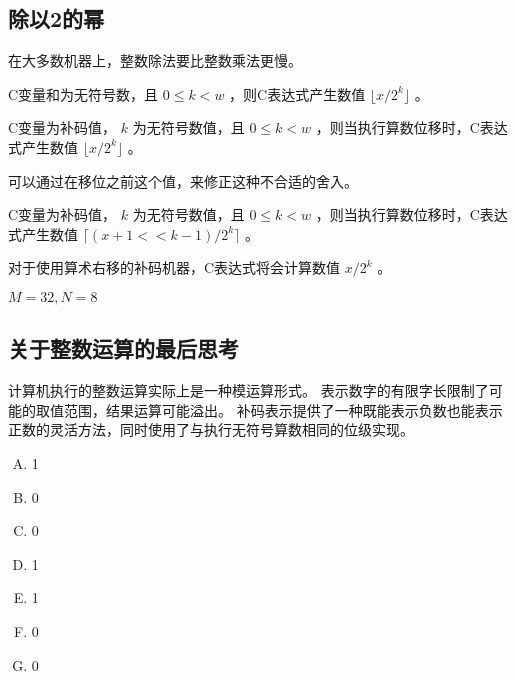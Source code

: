 {    \subsection{除以2的幂}
    {
        在大多数机器上，整数除法要比整数乘法更慢。

        \begin{defines}[除以2的幂的无符号除法]
            C变量和为无符号数，且 $0 \leq k < w$ ，则C表达式产生数值 $\lfloor x / 2^k \rfloor$ 。
        \end{defines}

        \begin{defines}
            C变量为补码值， $k$ 为无符号数值，且 $0 \leq k < w$ ，则当执行算数位移时，C表达式产生数值 $\lfloor x / 2^k \rfloor$ 。
        \end{defines}

        可以通过在移位之前这个值，来修正这种不合适的舍入。

        \begin{defines}
            C变量为补码值， $k$ 为无符号数值，且 $0 \leq k < w$ ，则当执行算数位移时，C表达式产生数值 $\lceil (x + 1 << k - 1) / 2^k \rceil$ 。
        \end{defines}

        对于使用算术右移的补码机器，C表达式将会计算数值 $x / 2^k$ 。

        \begin{practicec}

        \end{practicec}

        \begin{practicec}
            $M = 32, N = 8$
        \end{practicec}
    }

    \subsection{关于整数运算的最后思考}
    {
        计算机执行的整数运算实际上是一种模运算形式。
        表示数字的有限字长限制了可能的取值范围，结果运算可能溢出。
        补码表示提供了一种既能表示负数也能表示正数的灵活方法，同时使用了与执行无符号算数相同的位级实现。

        \begin{practicec}
            \begin{enumerate}[A.]
                \item 1
                \item 0
                \item 0
                \item 1
                \item 1
                \item 0
                \item 0
            \end{enumerate}
        \end{practicec}
    }
}
